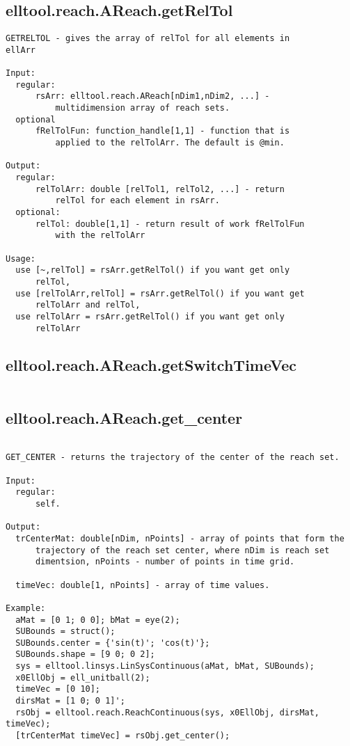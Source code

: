 \subsection{\texorpdfstring{elltool.reach.AReach.getRelTol}{getRelTol}}\label{method:elltool.reach.AReach.getRelTol}
\begin{verbatim}
GETRELTOL - gives the array of relTol for all elements in
ellArr

Input:
  regular:
      rsArr: elltool.reach.AReach[nDim1,nDim2, ...] -
          multidimension array of reach sets.
  optional
      fRelTolFun: function_handle[1,1] - function that is
          applied to the relTolArr. The default is @min.

Output:
  regular:
      relTolArr: double [relTol1, relTol2, ...] - return
          relTol for each element in rsArr.
  optional:
      relTol: double[1,1] - return result of work fRelTolFun
          with the relTolArr

Usage:
  use [~,relTol] = rsArr.getRelTol() if you want get only
      relTol,
  use [relTolArr,relTol] = rsArr.getRelTol() if you want get
      relTolArr and relTol,
  use relTolArr = rsArr.getRelTol() if you want get only
      relTolArr
\end{verbatim}
\subsection{\texorpdfstring{elltool.reach.AReach.getSwitchTimeVec}{getSwitchTimeVec}}\label{method:elltool.reach.AReach.getSwitchTimeVec}
\begin{verbatim}

\end{verbatim}
\subsection{\texorpdfstring{elltool.reach.AReach.get\_center}{get\_center}}\label{method:elltool.reach.AReach.getcenter}
\begin{verbatim}

GET_CENTER - returns the trajectory of the center of the reach set.

Input:
  regular:
      self.

Output:
  trCenterMat: double[nDim, nPoints] - array of points that form the
      trajectory of the reach set center, where nDim is reach set
      dimentsion, nPoints - number of points in time grid.

  timeVec: double[1, nPoints] - array of time values.

Example:
  aMat = [0 1; 0 0]; bMat = eye(2);
  SUBounds = struct();
  SUBounds.center = {'sin(t)'; 'cos(t)'};
  SUBounds.shape = [9 0; 0 2];
  sys = elltool.linsys.LinSysContinuous(aMat, bMat, SUBounds);
  x0EllObj = ell_unitball(2);
  timeVec = [0 10];
  dirsMat = [1 0; 0 1]';
  rsObj = elltool.reach.ReachContinuous(sys, x0EllObj, dirsMat, timeVec);
  [trCenterMat timeVec] = rsObj.get_center();
\end{verbatim}
